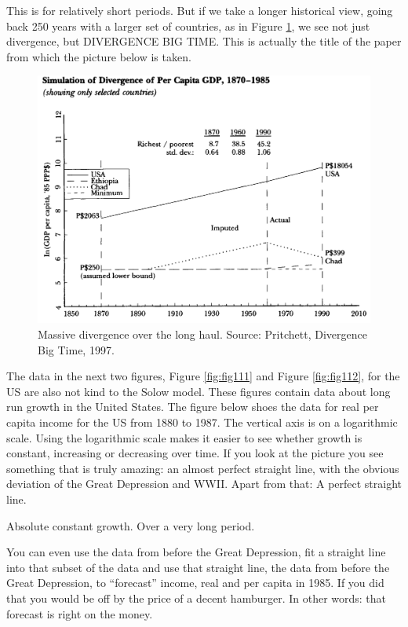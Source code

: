 \documentclass[
]{book}
\begin{document}
This is for relatively short periods. But if we take a longer historical view, going back 250 years with a larger set of countries, as in Figure \ref{fig:fig110}, we see not just divergence, but DIVERGENCE BIG TIME. This is actually the title of the paper from which the picture below is taken.

\begin{figure}
\includegraphics[width=1\linewidth]{img/ch1/growth10} \caption{Massive divergence over the long haul. Source: Pritchett, Divergence Big Time, 1997.}\label{fig:fig110}
\end{figure}

The data in the next two figures, Figure \ref{fig:fig111} and Figure \ref{fig:fig112}, for the US are also not kind to the Solow model. These figures contain data about long run growth in the United States. The figure below shoes the data for real per capita income for the US from 1880 to 1987. The vertical axis is on a logarithmic scale. Using the logarithmic scale makes it easier to see whether growth is constant, increasing or decreasing over time. If you look at the picture you see something that is truly amazing: an almost perfect straight line, with the obvious deviation of the Great Depression and WWII. Apart from that: A perfect straight line.

Absolute constant growth. Over a very long period.

You can even use the data from before the Great Depression, fit a straight line into that subset of the data and use that straight line, the data from before the Great Depression, to ``forecast'' income, real and per capita in 1985. If you did that you would be off by the price of a decent hamburger. In other words: that forecast is right on the money.
\end{document}
